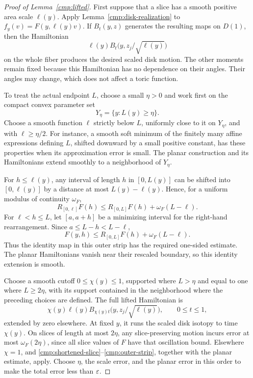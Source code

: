 \begin{proof}[Proof of Lemma~\ref{cmp:lifted}]
First suppose that a slice has a smooth positive area scale
\(\ell(y)\). Apply Lemma~\ref{cmp:disk-realization} to
\(f_y(v)=F(y,\ell(y)v)\).
If \(B_t(y,z)\) generates the resulting maps on \(D(1)\), then
the Hamiltonian
\[
 \ell(y)B_t\bigl(y,z_j/\sqrt{\ell(y)}\bigr)
\]
on the whole fiber produces the desired scaled disk motion.
The other moments remain fixed because this Hamiltonian has no
dependence on their angles. Their angles may change, which does
not affect a toric function.

To treat the actual endpoint \(L\), choose a small \(\eta>0\) and
work first on the compact convex parameter set
\[
 Y_\eta=\{y:L(y)\ge\eta\}.
\]
Choose a smooth function \(\ell\) strictly below \(L\), uniformly
close to it on \(Y_\eta\), and with \(\ell\ge\eta/2\).
For instance, a smooth soft minimum of the finitely many affine
expressions defining \(L\), shifted downward by a small positive
constant, has these properties when its approximation error is small.
The planar construction and its
Hamiltonians extend smoothly to a neighborhood of \(Y_\eta\).

For \(h\le\ell(y)\), any interval of length \(h\) in \([0,L(y)]\)
can be shifted into \([0,\ell(y)]\) by a distance at most
\(L(y)-\ell(y)\). Hence, for a uniform modulus of continuity
\(\omega_F\),
\begin{equation}\label{cmp:shortened-slice}
 R_{[0,\ell]}F(h)
 \le R_{[0,L]}F(h)+\omega_F(L-\ell).
\end{equation}
For \(\ell<h\le L\), let \([a,a+h]\) be a minimizing interval
for the right-hand rearrangement. Since \(a\le L-h<L-\ell\),
\begin{equation}\label{cmp:outer-strip}
 F(y,h)\le R_{[0,L]}F(h)+\omega_F(L-\ell).
\end{equation}
Thus the identity map in this outer strip has the required
one-sided estimate. The planar Hamiltonians vanish near their
rescaled boundary, so this identity extension is smooth.

Choose a smooth cutoff \(0\le\chi(y)\le1\), supported where
\(L>\eta\) and equal to one where \(L\ge2\eta\), with its support
contained in the neighborhood where the preceding choices are
defined. The full lifted Hamiltonian is
\begin{equation}\label{cmp:cutoff-hamiltonian}
 \chi(y)\ell(y)
 B_{\chi(y)t}\bigl(y,z_j/\sqrt{\ell(y)}\bigr),
 \qquad 0\le t\le1,
\end{equation}
extended by zero elsewhere. At fixed \(y\), it runs the scaled
disk isotopy to time \(\chi(y)\). On slices of length at most
\(2\eta\), any slice-preserving motion incurs error at most
\(\omega_F(2\eta)\), since all slice values of \(F\) have that
oscillation bound. Elsewhere \(\chi=1\), and
\eqref{cmp:shortened-slice}--\eqref{cmp:outer-strip}, together
with the planar estimate, apply. Choose \(\eta\), the scale
error, and the planar error in this order to make the total
error less than \(\varepsilon\).


\end{proof}
